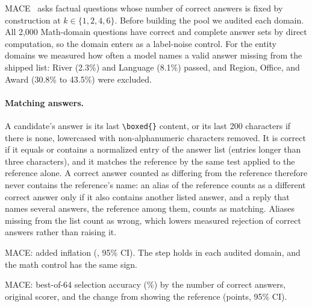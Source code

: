 \textsc{MACE}~\citep{mace2026} asks factual questions whose number of correct answers is fixed by construction at $k \in \{1,2,4,6\}$. Before building the pool we audited each domain. All 2,000 Math-domain questions have correct and complete answer sets by direct computation, so the domain enters as a label-noise control. For the entity domains we measured how often a model names a valid answer missing from the shipped list: River (2.3\%) and Language (8.1\%) passed, and Region, Office, and Award (30.8\% to 43.5\%) were excluded.

\paragraph{Matching answers.} A candidate's answer is its last \texttt{\textbackslash boxed\{\}} content, or its last 200 characters if there is none, lowercased with non-alphanumeric characters removed. It is correct if it equals or contains a normalized entry of the answer list (entries longer than three characters), and it matches the reference by the same test applied to the reference alone. A correct answer counted as differing from the reference therefore never contains the reference's name: an alias of the reference counts as a different correct answer only if it also contains another listed answer, and a reply that names several answers, the reference among them, counts as matching. Aliases missing from the list count as wrong, which lowers measured rejection of correct answers rather than raising it.

\begin{table}[htbp]
\centering
\caption{\textsc{MACE}: added inflation (\sd, 95\% CI). The step holds in each audited domain, and the math control has the same sign.\pre}
\label{tab:mace}
\footnotesize
\begin{adjustbox}{max width=\linewidth}\end{adjustbox}

\end{table}

\begin{table}[htbp]
\centering
\caption{\textsc{MACE}: best-of-64 selection accuracy (\%) by the number of correct answers, original scorer, and the change from showing the reference (points, 95\% CI).\ph}
\label{tab:mace-by-k}
\footnotesize
\begin{adjustbox}{max width=\linewidth}\end{adjustbox}

\end{table}

